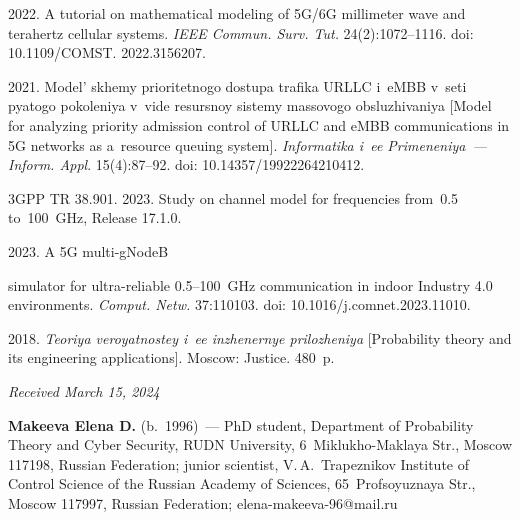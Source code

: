 \begin{multicols}{2}
{{\begin{thebibliography}{99}
2022.
A tutorial on mathematical modeling of 5G/6G millimeter wave and terahertz 
cellular systems.
\textit{IEEE Commun. Surv. Tut.} 24(2):1072--1116.
doi: 10.1109/COMST. 2022.3156207.

2021. Model' skhemy prioritetnogo do\-stu\-pa trafika URLLC i~eMBB v~seti pyatogo pokoleniya v~vide resursnoy sistemy massovogo obsluzhivaniya
[Model for analyzing priority admission control of URLLC and eMBB communications 
in 5G networks as a~resource queuing system].
\textit{Informatika i~ee Primeneniya~--- Inform. Appl}. 15(4):87--92.
doi: 10.14357/19922264210412.

3GPP TR 38.901. 2023. Study on channel model for frequencies from~0.5 to~100~GHz, 
Release 17.1.0.

2023.
A 5G multi-gNodeB\linebreak\vspace*{-12pt}

\pagebreak

\noindent
 simulator for ultra-reliable 0.5--100~GHz communication in 
indoor Industry 4.0 environments.
\textit{Comput. Netw.} 37:110103. doi: 10.1016/j.comnet.2023.11010.

2018.
\textit{Teoriya veroyatnostey i~ee inzhenernye prilozheniya}
[Probability theory and its engineering applications].
Moscow: Justice. 480~p.

\end{thebibliography}

 }
 }

\end{multicols}

\vspace*{-6pt}

\hfill{\small\textit{Received March 15, 2024}} 

\vspace*{-12pt}


\Contr

\vspace*{-3pt}

\noindent
\textbf{Makeeva Elena D.} (b.\ 1996)~--- PhD student, Department of Probability 
Theory and Cyber Security, RUDN University, 6~Miklukho-Maklaya Str., Moscow 
117198, Russian Federation; junior scientist, V.\,A.~Trapeznikov Institute of 
Control Science of the Russian Academy of Sciences, 65~Profsoyuznaya Str., 
Moscow 117997, Russian Federation; \mbox{elena-makeeva-96@mail.ru}

